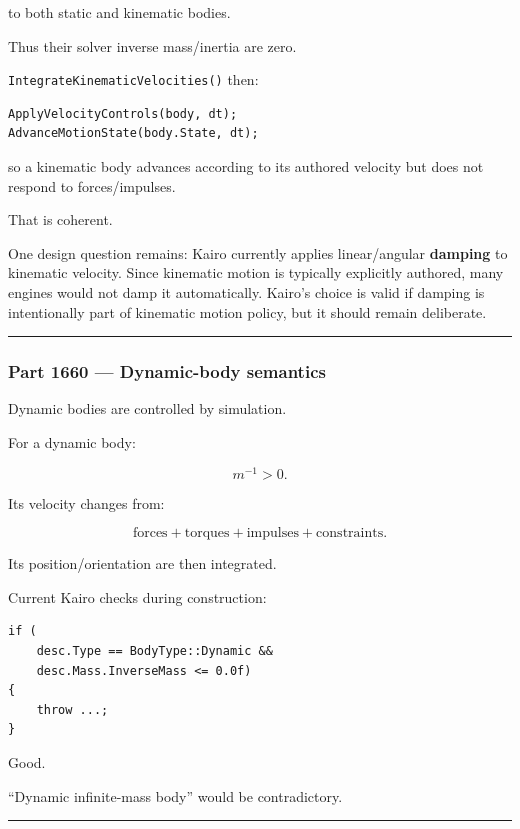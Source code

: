 to both static and kinematic bodies.

Thus their solver inverse mass/inertia are zero.

\texttt{IntegrateKinematicVelocities()} then:

\begin{verbatim}
ApplyVelocityControls(body, dt);
AdvanceMotionState(body.State, dt);
\end{verbatim}

so a kinematic body advances according to its authored velocity but does not respond to forces/impulses.

That is coherent.

One design question remains: Kairo currently applies linear/angular \textbf{damping} to kinematic velocity. Since kinematic motion is typically explicitly authored, many engines would not damp it automatically. Kairo's choice is valid if damping is intentionally part of kinematic motion policy, but it should remain deliberate.

\begin{center}\rule{0.5\linewidth}{0.5pt}\end{center}

\subsubsection{Part 1660 --- Dynamic-body semantics}\label{part-1660-dynamic-body-semantics}

Dynamic bodies are controlled by simulation.

For a dynamic body:

\[
m^{-1}>0.
\]

Its velocity changes from:

\[
\text{forces}
+
\text{torques}
+
\text{impulses}
+
\text{constraints}.
\]

Its position/orientation are then integrated.

Current Kairo checks during construction:

\begin{verbatim}
if (
    desc.Type == BodyType::Dynamic &&
    desc.Mass.InverseMass <= 0.0f)
{
    throw ...;
}
\end{verbatim}

Good.

``Dynamic infinite-mass body'' would be contradictory.

\begin{center}\rule{0.5\linewidth}{0.5pt}\end{center}

